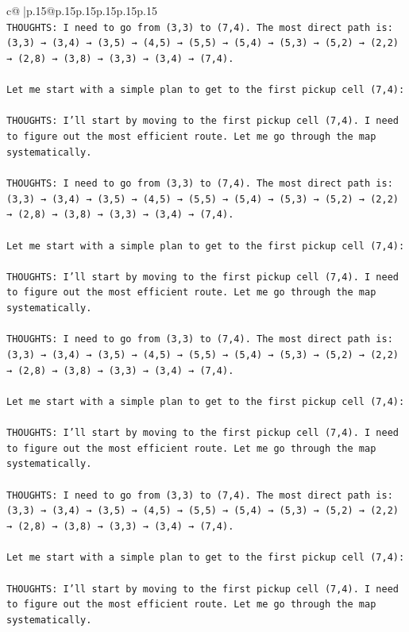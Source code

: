 \documentclass{article}
\begin{document}
{\begin{supertabular}{c@{$\;$}|p{.15\linewidth}@{}p{.15\linewidth}p{.15\linewidth}p{.15\linewidth}p{.15\linewidth}p{.15\linewidth}}
{{{\\ 
\texttt{THOUGHTS: I need to go from (3,3) to (7,4). The most direct path is: (3,3) → (3,4) → (3,5) → (4,5) → (5,5) → (5,4) → (5,3) → (5,2) → (2,2) → (2,8) → (3,8) → (3,3) → (3,4) → (7,4).} \\
\\ 
\texttt{Let me start with a simple plan to get to the first pickup cell (7,4):} \\
\\ 
\texttt{THOUGHTS: I'll start by moving to the first pickup cell (7,4). I need to figure out the most efficient route. Let me go through the map systematically.} \\
\\ 
\texttt{THOUGHTS: I need to go from (3,3) to (7,4). The most direct path is: (3,3) → (3,4) → (3,5) → (4,5) → (5,5) → (5,4) → (5,3) → (5,2) → (2,2) → (2,8) → (3,8) → (3,3) → (3,4) → (7,4).} \\
\\ 
\texttt{Let me start with a simple plan to get to the first pickup cell (7,4):} \\
\\ 
\texttt{THOUGHTS: I'll start by moving to the first pickup cell (7,4). I need to figure out the most efficient route. Let me go through the map systematically.} \\
\\ 
\texttt{THOUGHTS: I need to go from (3,3) to (7,4). The most direct path is: (3,3) → (3,4) → (3,5) → (4,5) → (5,5) → (5,4) → (5,3) → (5,2) → (2,2) → (2,8) → (3,8) → (3,3) → (3,4) → (7,4).} \\
\\ 
\texttt{Let me start with a simple plan to get to the first pickup cell (7,4):} \\
\\ 
\texttt{THOUGHTS: I'll start by moving to the first pickup cell (7,4). I need to figure out the most efficient route. Let me go through the map systematically.} \\
\\ 
\texttt{THOUGHTS: I need to go from (3,3) to (7,4). The most direct path is: (3,3) → (3,4) → (3,5) → (4,5) → (5,5) → (5,4) → (5,3) → (5,2) → (2,2) → (2,8) → (3,8) → (3,3) → (3,4) → (7,4).} \\
\\ 
\texttt{Let me start with a simple plan to get to the first pickup cell (7,4):} \\
\\ 
\texttt{THOUGHTS: I'll start by moving to the first pickup cell (7,4). I need to figure out the most efficient route. Let me go through the map systematically.} \\
}}}
\end{supertabular}}
\end{document}
